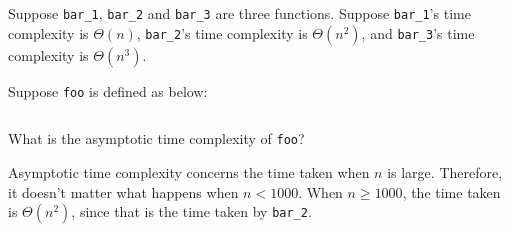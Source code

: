 \begin{prob}
    Suppose \texttt{bar_1}, \texttt{bar_2} and \texttt{bar_3} are three functions.
    Suppose \texttt{bar_1}'s time complexity is $\Theta(n)$, \texttt{bar_2}'s
    time complexity is $\Theta(n^2)$, and \texttt{bar_3}'s
    time complexity is $\Theta(n^3)$.

    Suppose \texttt{foo} is defined as below:

    \inputminted{python}{code.py}

    What is the asymptotic time complexity of \texttt{foo}?


    \begin{soln}
        Asymptotic time complexity concerns the time taken when $n$ is large.
        Therefore, it doesn't matter what happens when $n < 1000$.
        When $n \geq 1000$, the time taken is $\Theta(n^2)$, since that is the
        time taken by \texttt{bar_2}.
    \end{soln}
\end{prob}
